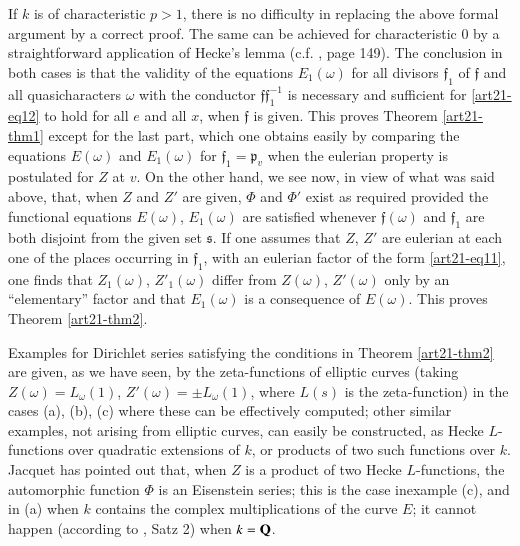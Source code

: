 If $k$ is of characteristic $p>1$, there is no difficulty in replacing the above formal argument by a correct proof. The same can be achieved for characteristic $0$ by a straightforward application of Hecke's lemma (c.f. \cite{art21-key2}, page 149). The conclusion in both cases is that the validity of the equations $E_{1}(\omega)$ for all divisors $\mathfrak{f}_{1}$ of $\mathfrak{f}$ and all quasicharacters $\omega$ with the conductor $\mathfrak{f}\mathfrak{f}^{-1}_{1}$ is necessary and sufficient for \eqref{art21-eq12} to hold for all $e$ and all $x$, when $\mathfrak{f}$ is given. This proves Theorem \ref{art21-thm1} except for the last part, which one obtains easily by comparing the equations $E(\omega)$ and $E_{1}(\omega)$ for $\mathfrak{f}_{1}=\mathfrak{p}_{v}$ when the eulerian property is postulated for $Z$ at $v$. On the other hand, we see now, in view of what was said above, that, when $Z$ and $Z'$ are given, $\Phi$ and $\Phi'$ exist as required provided the functional equations $E(\omega)$, $E_{1}(\omega)$ are satisfied whenever $\mathfrak{f}(\omega)$ and $\mathfrak{f}_{1}$ are both disjoint from the given set $\mathfrak{s}$. If one assumes that $Z$, $Z'$ are eulerian at each one of the places occurring in $\mathfrak{f}_{1}$, with an eulerian factor of the form \eqref{art21-eq11}, one finds that $Z_{1}(\omega)$, $Z'_{1}(\omega)$ differ from $Z(\omega)$, $Z'(\omega)$ only by an ``elementary'' factor and that $E_{1}(\omega)$ is a consequence of $E(\omega)$. This proves Theorem \ref{art21-thm2}.

Examples for Dirichlet series satisfying the conditions in Theorem \ref{art21-thm2} are given, as we have seen, by the zeta-functions of elliptic curves (taking $Z(\omega)=L_{\omega}(1)$, $Z'(\omega)=\pm L_{\omega}(1)$, where $L(s)$ is the zeta-function) in the cases (a), (b), (c) where these can be effectively computed; other similar examples, not arising from elliptic curves, can easily be constructed, as Hecke $L$-functions over quadratic extensions of $k$, or products of two such functions over $k$. Jacquet has pointed out that, when $Z$ is a product of two Hecke $L$-functions, the automorphic function $\Phi$ is an Eisenstein series; this is the case in\pageoriginale example (c), and in (a) when $k$ contains the complex multiplications of the curve $E$; it cannot happen (according to \cite{art21-key2}, Satz 2) when $k=\mathbf{Q}$.

